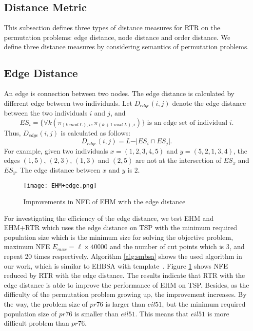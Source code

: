 \subsection{Distance Metric}

This subsection defines three types of distance measures for RTR on the permutation problems: edge distance, node distance and order distance. We define three distance measures by considering semantics of permutation problems.
\subsection*{Edge Distance}


An edge is connection between two nodes. The edge distance is calculated by different edge between two individuals. Let $D_{edge} (i,j)$ denote the edge distance between the two individuals $i$ and $j$, and \[ES_i=\lbrace\forall k(\pi_{(k\ mod\ L),i}, \pi_{(k+1\ mod\ L),i})\rbrace\mbox{ is an edge set of individual }i.\] Thus, $D_{edge} (i,j)$ is calculated as follows:\[D_{edge} (i,j)=L-\vert ES_i\cap ES_j\vert.\] For example, given two individuals $x=(1,2,3,4,5)$ and $y=(5,2,1,3,4)$, the edges $(1,5)$, $(2,3)$, $(1,3)$ and $(2,5)$ are not at the intersection of $ES_x$ and $ES_y$. The edge distance between $x$ and $y$ is $2$. 


\begin{figure}[htbp] 
        \centering
        \texttt{[image: EHM+edge.png]}
        \caption{ Improvements in NFE of EHM with the edge distance } 
        \label{fig:ehbsa_imp}
\end{figure}

For investigating the efficiency of the edge distance, we test EHM and EHM+RTR which uses the edge distance on TSP with the minimum required population size which is the minimum size for solving the objective problem, maximum NFE $E_{max} = \ell\times 40000$ and the number of cut points which is 3, and repeat 20 times respectively. Algorithm \ref{alg:smbsa} shows the used algorithm in our work, which is similar to EHBSA with template~\cite{tsutsui2002probabilistic}. Figure \ref{fig:ehbsa_imp} shows NFE reduced by RTR with the edge distance. 
The results indicate that RTR with the edge distance is able to improve the performance of EHM on TSP. Besides, as the difficulty of the permutation problem growing up, the improvement increases. By the way, the problem size of $pr76$ is larger than $eil51$, but the minimum required population size of $pr76$ is smaller than $eil51$. This means that $eil51$ is more difficult problem than $pr76$. 

